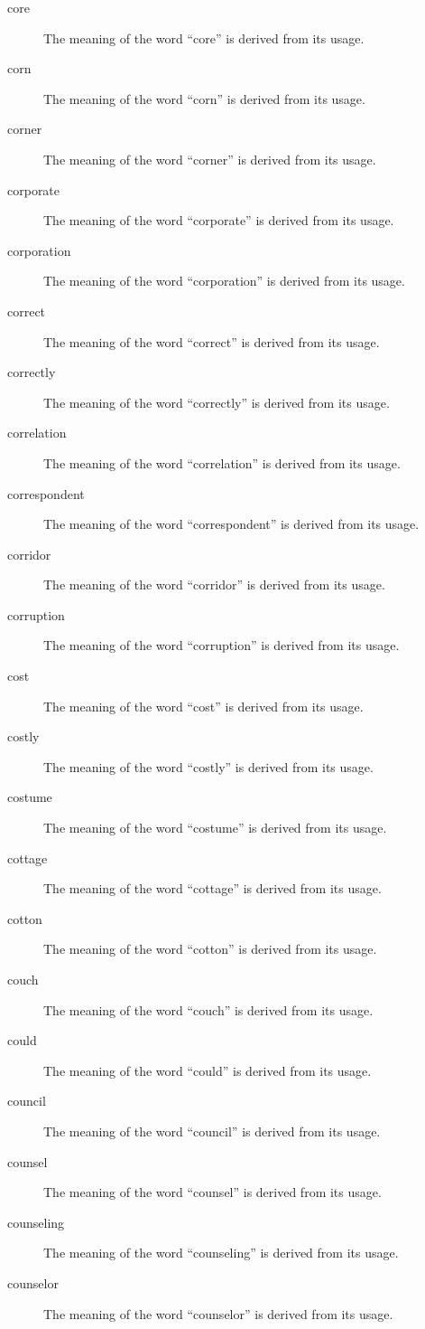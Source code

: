 \documentclass[12pt, letterpaper]{memoir}
\begin{document}
\begin{description}
\item[core] The meaning of the word ``core'' is derived from its usage.
\item[corn] The meaning of the word ``corn'' is derived from its usage.
\item[corner] The meaning of the word ``corner'' is derived from its usage.
\item[corporate] The meaning of the word ``corporate'' is derived from its usage.
\item[corporation] The meaning of the word ``corporation'' is derived from its usage.
\item[correct] The meaning of the word ``correct'' is derived from its usage.
\item[correctly] The meaning of the word ``correctly'' is derived from its usage.
\item[correlation] The meaning of the word ``correlation'' is derived from its usage.
\item[correspondent] The meaning of the word ``correspondent'' is derived from its usage.
\item[corridor] The meaning of the word ``corridor'' is derived from its usage.
\item[corruption] The meaning of the word ``corruption'' is derived from its usage.
\item[cost] The meaning of the word ``cost'' is derived from its usage.
\item[costly] The meaning of the word ``costly'' is derived from its usage.
\item[costume] The meaning of the word ``costume'' is derived from its usage.
\item[cottage] The meaning of the word ``cottage'' is derived from its usage.
\item[cotton] The meaning of the word ``cotton'' is derived from its usage.
\item[couch] The meaning of the word ``couch'' is derived from its usage.
\item[could] The meaning of the word ``could'' is derived from its usage.
\item[council] The meaning of the word ``council'' is derived from its usage.
\item[counsel] The meaning of the word ``counsel'' is derived from its usage.
\item[counseling] The meaning of the word ``counseling'' is derived from its usage.
\item[counselor] The meaning of the word ``counselor'' is derived from its usage.

\end{description}
\end{document}
